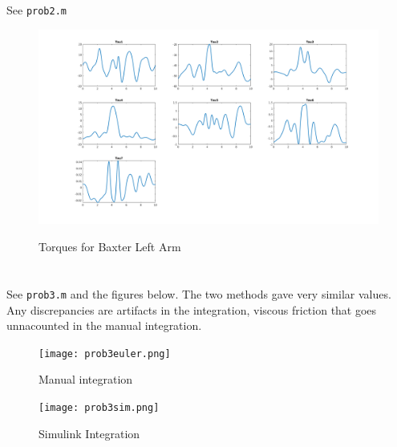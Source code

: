 \documentclass{../homework}
\begin{document}
\begin{parts}[n]
       \part{} See \texttt{prob2.m}
        \begin{figure}[H]
            \centering
            \includegraphics[scale=.3]{prob2.png}
            \label{torq}
            \caption{Torques for Baxter Left Arm}
       \end{figure}

       \part{} See \texttt{prob3.m} and the figures below. The two methods gave very similar values. Any discrepancies are artifacts in the integration, viscous friction that goes unnacounted in the manual integration.
        \begin{figure}[H]
            \centering
            \texttt{[image: prob3euler.png]}
            \label{torq}
            \caption{Manual integration}
       \end{figure}
        \begin{figure}[H]
            \centering
            \texttt{[image: prob3sim.png]}
            \label{torq}
            \caption{Simulink Integration}
       \end{figure}

   \end{parts}
\end{document}
